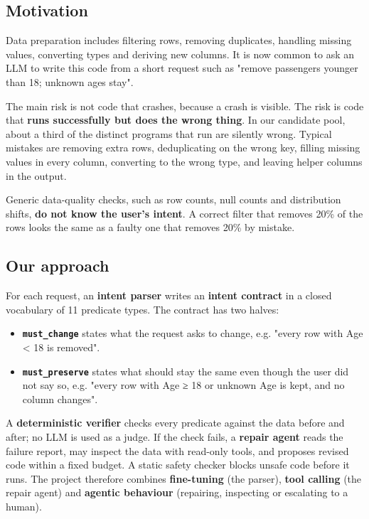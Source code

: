 \documentclass[11pt]{article}
\providecommand{\tightlist}{\setlength{\itemsep}{0pt}\setlength{\parskip}{0pt}}
\begin{document}
\subsection{Motivation}

Data preparation includes filtering rows, removing duplicates, handling
missing values, converting types and deriving new columns. It is now
common to ask an LLM to write this code from a short request such as
"remove passengers younger than 18; unknown ages stay".

The main risk is not code that crashes, because a crash is visible. The
risk is code that \textbf{runs successfully but does the wrong thing}.
In our candidate pool, about a third of the distinct programs that run
are silently wrong. Typical mistakes are removing extra rows,
deduplicating on the wrong key, filling missing values in every column,
converting to the wrong type, and leaving helper columns in the output.

Generic data-quality checks, such as row counts, null counts and
distribution shifts, \textbf{do not know the user's intent}. A correct
filter that removes 20\% of the rows looks the same as a faulty one that
removes 20\% by mistake.

\subsection{Our approach}

For each request, an \textbf{intent parser} writes an \textbf{intent
contract} in a closed vocabulary of 11 predicate types. The contract has
two halves:

\begin{itemize}
\tightlist
\item
  \textbf{\texttt{must\_\allowbreak{}change}} states what the request
  asks to change, e.g. "every row with Age \textless{} 18 is removed".
\item
  \textbf{\texttt{must\_\allowbreak{}preserve}} states what should stay
  the same even though the user did not say so, e.g. "every row with Age
  ≥ 18 or unknown Age is kept, and no column changes".
\end{itemize}

A \textbf{deterministic verifier} checks every predicate against the
data before and after; no LLM is used as a judge. If the check fails, a
\textbf{repair agent} reads the failure report, may inspect the data
with read-only tools, and proposes revised code within a fixed budget. A
static safety checker blocks unsafe code before it runs. The project
therefore combines \textbf{fine-tuning} (the parser), \textbf{tool
calling} (the repair agent) and \textbf{agentic behaviour} (repairing,
inspecting or escalating to a human).
\end{document}
